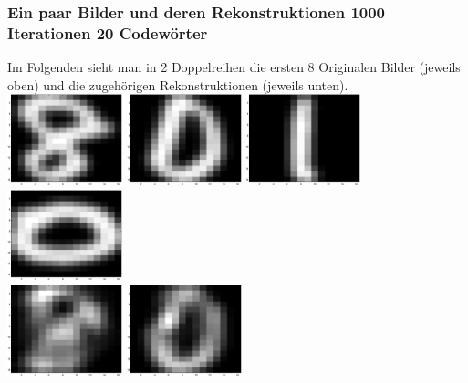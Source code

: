 \documentclass{article}
\begin{document}
\subsubsection*{Ein paar Bilder und deren Rekonstruktionen 1000 Iterationen 20 Codewörter}
Im Folgenden sieht man in 2 Doppelreihen die ersten 8 Originalen Bilder (jeweils
oben) und die zugehörigen Rekonstruktionen (jeweils unten).\\
\includegraphics[width=0.25\textwidth]{digits1.eps}\hspace{0.03\textwidth}%
\includegraphics[width=0.25\textwidth]{digits2.eps}\hspace{0.03\textwidth}%
\includegraphics[width=0.25\textwidth]{digits3.eps}\hspace{0.03\textwidth}%
\includegraphics[width=0.25\textwidth]{digits4.eps}\\[1em]
\includegraphics[width=0.25\textwidth]{reconst1.eps}\hspace{0.03\textwidth}%
\includegraphics[width=0.25\textwidth]{reconst2.eps}\hspace{0.03\textwidth}%
\end{document}
